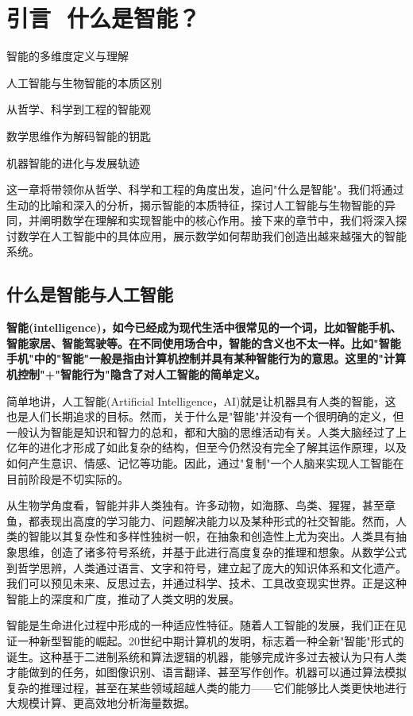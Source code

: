 \chapter{ 引言\,\,  什么是智能？}
 \begin{introduction}
  \item 智能的多维度定义与理解
  \item 人工智能与生物智能的本质区别
  \item 从哲学、科学到工程的智能观
  \item 数学思维作为解码智能的钥匙
  \item 机器智能的进化与发展轨迹
\end{introduction}

这一章将带领你从哲学、科学和工程的角度出发，追问"什么是智能"。我们将通过生动的比喻和深入的分析，揭示智能的本质特征，探讨人工智能与生物智能的异同，并阐明数学在理解和实现智能中的核心作用。接下来的章节中，我们将深入探讨数学在人工智能中的具体应用，展示数学如何帮助我们创造出越来越强大的智能系统。

\section{什么是智能与人工智能}

\textbf{智能(intelligence)，如今已经成为现代生活中很常见的一个词，比如智能手机、智能家居、智能驾驶等。在不同使用场合中，智能的含义也不太一样。比如"智能手机"中的"智能"一般是指由计算机控制并具有某种智能行为的意思。这里的"计算机控制"+"智能行为"隐含了对人工智能的简单定义。}

简单地讲，人工智能(Artificial Intelligence，AI)就是让机器具有人类的智能，这也是人们长期追求的目标。然而，关于什么是"智能"并没有一个很明确的定义，但一般认为智能是知识和智力的总和，都和大脑的思维活动有关。人类大脑经过了上亿年的进化才形成了如此复杂的结构，但至今仍然没有完全了解其运作原理，以及如何产生意识、情感、记忆等功能。因此，通过"复制"一个人脑来实现人工智能在目前阶段是不切实际的。

从生物学角度看，智能并非人类独有。许多动物，如海豚、鸟类、猩猩，甚至章鱼，都表现出高度的学习能力、问题解决能力以及某种形式的社交智能。然而，人类的智能以其复杂性和多样性独树一帜，在抽象和创造性上尤为突出。人类具有抽象思维，创造了诸多符号系统，并基于此进行高度复杂的推理和想象。从数学公式到哲学思辨，人类通过语言、文字和符号，建立起了庞大的知识体系和文化遗产。我们可以预见未来、反思过去，并通过科学、技术、工具改变现实世界。正是这种智能上的深度和广度，推动了人类文明的发展。

智能是生命进化过程中形成的一种适应性特征。随着人工智能的发展，我们正在见证一种新型智能的崛起。20世纪中期计算机的发明，标志着一种全新"智能"形式的诞生。这种基于二进制系统和算法逻辑的机器，能够完成许多过去被认为只有人类才能做到的任务，如图像识别、语言翻译、甚至写作创作。机器可以通过算法模拟复杂的推理过程，甚至在某些领域超越人类的能力——它们能够比人类更快地进行大规模计算、更高效地分析海量数据。

